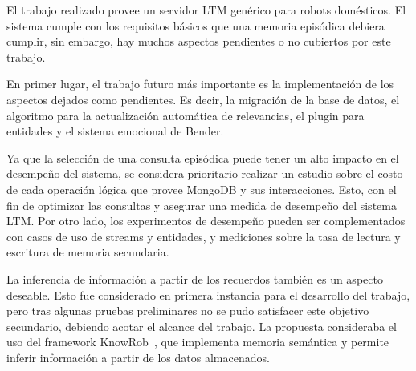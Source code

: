 \begin{conclusion}
El trabajo realizado provee un servidor LTM genérico para robots domésticos. El sistema cumple con los requisitos básicos que una memoria episódica debiera cumplir, sin embargo, hay muchos aspectos pendientes o no cubiertos por este trabajo.

En primer lugar, el trabajo futuro más importante es la implementación de los aspectos dejados como pendientes. Es decir, la migración de la base de datos, el algoritmo para la actualización automática de relevancias, el plugin para entidades y el sistema emocional de Bender.

Ya que la selección de una consulta episódica puede tener un alto impacto en el desempeño del sistema, se considera prioritario realizar un estudio sobre el costo de cada operación lógica que provee MongoDB y sus interacciones. Esto, con el fin de optimizar las consultas y asegurar una medida de desempeño del sistema LTM. Por otro lado, los experimentos de desempeño pueden ser complementados con casos de uso de streams y entidades, y mediciones sobre la tasa de lectura y escritura de memoria secundaria.

La inferencia de información a partir de los recuerdos también es un aspecto deseable. Esto fue considerado en primera instancia para el desarrollo del trabajo, pero tras algunas pruebas preliminares no se pudo satisfacer este objetivo secundario, debiendo acotar el alcance del trabajo. La propuesta consideraba el uso del framework KnowRob~\cite{Winkler2014,Tenorth2013,Tenorth2009}, que implementa memoria semántica y permite inferir información a partir de los datos almacenados.



\end{conclusion}